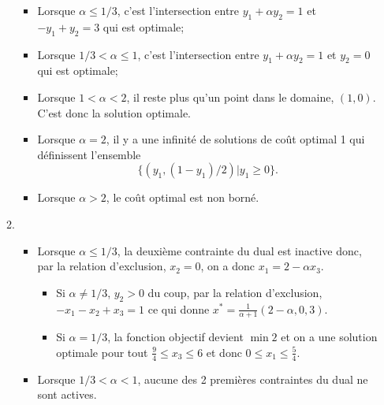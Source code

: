 \begin{enumerate}
\begin{solution}
\begin{enumerate}
\begin{center}
          \end{center}
          \begin{itemize}
            \item Lorsque $\alpha \leq 1/3$, c'est l'intersection entre
              $y_1 + \alpha y_2 = 1$ et $-y_1 + y_2 = 3$  qui est optimale;
            \item Lorsque $1/3 < \alpha \leq 1$, c'est l'intersection entre
              $y_1 + \alpha y_2 = 1$ et $y_2 = 0$  qui est optimale;
            \item Lorsque $1 < \alpha < 2$, il reste plus qu'un point dans le
              domaine, $(1,0)$. C'est donc la solution optimale.
            \item Lorsque $\alpha = 2$, il y a une infinité de solutions
              de coût optimal 1 qui définissent l'ensemble
              \[ \{(y_1,(1-y_1)/2) | y_1 \geq 0\}. \]
            \item Lorsque $\alpha > 2$, le coût optimal est non borné.
          \end{itemize}
        \item
          \begin{itemize}
            \item Lorsque $\alpha \leq 1/3$, la deuxième contrainte
              du dual est inactive donc,
              par la relation d'exclusion, $x_2 = 0$, on a donc
              $x_1 = 2 - \alpha x_3$.
              \begin{itemize}
                \item Si $\alpha \neq 1/3$, $y_2 > 0$ du coup,
                  par la relation d'exclusion, $-x_1 -x_2+ x_3 = 1$ ce qui
                  donne $x^* = \frac{1}{\alpha+1}(2-\alpha,0, 3)$.
                \item Si $\alpha = 1/3$, la fonction objectif devient
                  $\min 2$ et on a une solution optimale pour tout
                  $\frac{9}{4} \leq x_3 \leq 6$ et donc
                  $0 \leq x_1 \leq \frac{5}{4}$.
              \end{itemize}
            \item Lorsque $1/3 < \alpha < 1$,
              aucune des 2 premières contraintes du dual ne sont actives.

\end{itemize}
\end{enumerate}
\end{solution}
\end{enumerate}
